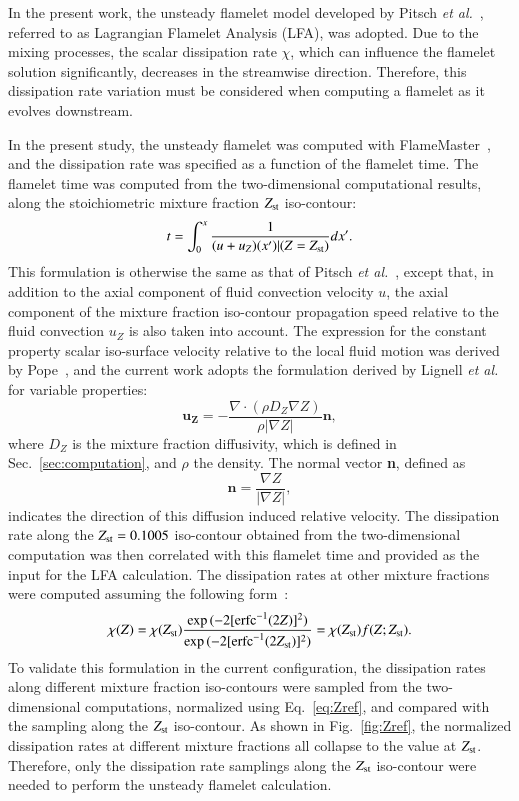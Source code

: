 \documentclass[review,3p,times]{elsarticle}
\begin{document}
\textcolor{mycolor}{In the present work, the unsteady flamelet model developed by Pitsch \emph{et al.}~\cite{pitsch98a}, referred to as Lagrangian Flamelet Analysis (LFA), was adopted.}  Due to the mixing processes, the scalar dissipation rate $\chi$, which can influence the flamelet solution significantly, decreases in the streamwise direction.  Therefore, this dissipation rate variation must be considered when computing a flamelet as it evolves downstream.

In the present study, the unsteady flamelet was computed with FlameMaster~\cite{flamemaster}, and the dissipation rate was specified as a function of the flamelet time.  The flamelet time was computed from the two-dimensional computational results, along the stoichiometric mixture fraction $Z_{\rm st}$ iso-contour: 
 \begin{equation} \label{eq:t}
t = \int ^{x}_{0} \frac{1}{(u + u_Z)(x')|(Z=Z_{\rm st})} dx'.
\end{equation}
This formulation is otherwise the same as that of Pitsch \emph {et al.}~\cite{pitsch98a}, except that, in addition to the axial component of fluid convection velocity $u$, the axial component of the mixture fraction iso-contour propagation speed relative to the fluid convection $u_Z$ is also taken into account.  The expression for the constant property scalar iso-surface velocity relative to the local fluid motion was derived by Pope~\cite{pope88}, and the current work adopts the formulation derived by Lignell \emph {et al.}~\cite{lignell07} for variable properties:
\begin{equation}
\mathbf{u_Z} = -\frac{\nabla \cdot (\rho D_Z \nabla Z) }{\rho |\nabla Z|} \mathbf{n},
\end{equation}  
where $D_Z$ is the mixture fraction diffusivity, \textcolor{mycolor}{which is defined in Sec.~\ref{sec:computation}}, and $\rho$ the density.  The normal vector \textbf{n}, defined as
\begin{equation}
\mathbf{n} = \frac{\nabla Z}{|\nabla Z|},
\end{equation}
indicates the direction of this diffusion induced relative velocity.
The dissipation rate along the $Z_{\rm st} = 0.1005$ iso-contour obtained from the two-dimensional computation was then correlated with this flamelet time and provided as the input for the LFA calculation.  The dissipation rates at other mixture fractions were computed assuming the following form~\cite{petersbook}:
\begin{equation} \label{eq:Zref}
\chi{(Z)} = \chi{(Z_{\rm st})} \frac{\exp{(-2[{\rm erfc}^{-1}(2Z)]^2)}}{\exp{(-2[{\rm erfc}^{-1}(2Z_{\rm st})]^2)}} = \chi{(Z_{\rm st})} f(Z;Z_{\rm st}).
\end{equation}
To validate this formulation in the current configuration, the dissipation rates along different mixture fraction iso-contours were sampled from the two-dimensional computations, normalized using Eq.~\ref{eq:Zref}, and compared with the sampling along the $Z_{\rm st}$ iso-contour.  As shown in Fig.~\ref{fig:Zref}, the normalized dissipation rates at different mixture fractions all collapse to the value at $Z_{\rm st}$.  Therefore, only the dissipation rate samplings along the $Z_{\rm st}$ iso-contour were needed to perform the unsteady flamelet calculation.
\end{document}
